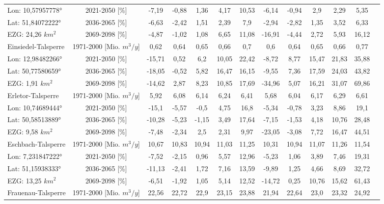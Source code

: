 \begin{longtable}{@{\extracolsep{\fill}}lc|ccccc||cccccc}
\cline{2-13} 
Lon: 10,57957778° & 2021-2050 [\%]  & -7,19 & -0,88 & 1,36 & 4,17 & 10,53 & -6,14 & -0,94 & 2,9 & 2,29 & 5,35 & \\ 
Lat: 51,84072222° & 2036-2065 [\%]  & -6,63 & -2,42 & 1,51 & 2,39 & 7,9 & -2,94 & -2,82 & 1,35 & 3,52 & 6,33 & \\ 
EZG: 24,26 $km^2$ & 2069-2098 [\%]  & -4,87 & -1,02 & 1,08 & 6,65 & 11,08 & -16,91 & -4,44 & 2,72 & 5,93 & 16,12 & \\ 
\hline 
Einsiedel-Talsperre & 1971-2000 [Mio. $m^3/y$]  & 0,62 & 0,64 & 0,65 & 0,66 & 0,7 & 0,6 & 0,64 & 0,65 & 0,66 & 0,77 & \\ 
\cline{2-13} 
Lon: 12,98482266° & 2021-2050 [\%]  & -15,71 & 0,52 & 6,2 & 10,05 & 22,42 & -8,72 & 8,77 & 15,47 & 21,83 & 35,88 & \\ 
Lat: 50,77580659° & 2036-2065 [\%]  & -18,05 & -0,52 & 5,82 & 16,47 & 16,15 & -9,55 & 7,36 & 17,59 & 24,03 & 43,82 & \\ 
EZG: 1,91 $km^2$ & 2069-2098 [\%]  & -14,62 & 2,87 & 8,23 & 10,85 & 17,69 & -34,96 & 5,07 & 16,21 & 31,07 & 69,86 & \\ 
\hline 
Erletor-Talsperre & 1971-2000 [Mio. $m^3/y$]  & 5,92 & 6,08 & 6,14 & 6,24 & 6,41 & 5,68 & 6,04 & 6,17 & 6,29 & 6,61 & \\ 
\cline{2-13} 
Lon: 10,74689444° & 2021-2050 [\%]  & -15,1 & -5,57 & -0,5 & 4,75 & 16,8 & -5,34 & -0,78 & 3,23 & 8,86 & 19,1 & \\ 
Lat: 50,58513889° & 2036-2065 [\%]  & -10,28 & -5,23 & -1,15 & 3,49 & 17,64 & -7,15 & -1,53 & 4,18 & 10,76 & 28,48 & \\ 
EZG: 9,58 $km^2$ & 2069-2098 [\%]  & -7,48 & -2,34 & 2,5 & 2,31 & 9,97 & -23,05 & -3,08 & 7,72 & 16,47 & 44,51 & \\ 
\hline 
Eschbach-Talsperre & 1971-2000 [Mio. $m^3/y$]  & 10,67 & 10,83 & 10,94 & 11,03 & 11,25 & 10,31 & 10,94 & 11,07 & 11,26 & 11,54 & \\ 
\cline{2-13} 
Lon: 7,231847222° & 2021-2050 [\%]  & -7,52 & -2,15 & 0,96 & 5,57 & 12,96 & -5,23 & 1,06 & 3,89 & 7,46 & 19,31 & \\ 
Lat: 51,15938333° & 2036-2065 [\%]  & -11,13 & -2,41 & 1,72 & 7,16 & 13,59 & -9,89 & 1,25 & 4,66 & 8,69 & 32,72 & \\ 
EZG: 13,25 $km^2$ & 2069-2098 [\%]  & -6,51 & -1,92 & 1,05 & 5,14 & 12,52 & -14,72 & 0,25 & 10,76 & 15,62 & 61,43 & \\ 
\hline 
Frauenau-Talsperre & 1971-2000 [Mio. $m^3/y$]  & 22,56 & 22,72 & 22,9 & 23,15 & 23,88 & 21,94 & 22,64 & 23,0 & 23,32 & 24,92 & \\ 

\end{longtable}
